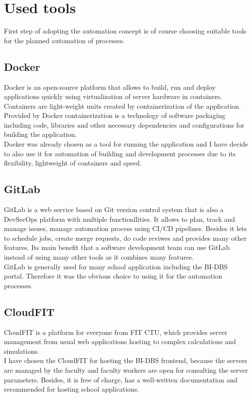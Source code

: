\section{Used tools} First step of adopting the automation concept is of course choosing suitable tools for the planned automation of processes.


\subsection{Docker} Docker is an open-source platform that allows to build, run and deploy applications quickly using virtualization of server hardware in containers. Containers are light-weight units created by containerization of the application. Provided by Docker containerization is a technology of software packaging including code, libraries and other necessary dependencies and configurations for building the application.\\
Docker was already chosen as a tool for running the application and I have decide to also use it for automation of building and development processes due to its flexibility, lightweight of containers and speed. \cite{docker, docker-2}

\subsection{GitLab} GitLab is a web service based on Git version control system that is also a DevSecOps \cite{devsecops} platform with multiple functionllities. It allows to plan, track and manage issues, manage automation process using CI/CD pipelines. Besides it lets to schedule jobs, create merge requests, do code reviwes and provides many other features. Its main benefit that a software development team can use GitLab instead of using many other tools as it combines many features. \cite{gitlab, gitlab-2}\\
GitLab is generally used for many school application including the BI-DBS portal. Therefore it was the obvious choice to using it for the automation processes. 



\subsection{CloudFIT} CloudFIT is a platform for everyone from FIT CTU, which provides server management from usual web applications hosting to complex calculations and simulations. \cite{cloudfit}\\
I have chosen the CloudFIT for hosting the BI-DBS frontend, because the servers are managed by the faculty and faculty workers are open for consulting the server parameters. Besides, it is free of charge, has a well-written documentation and recommended for hosting school applications.

